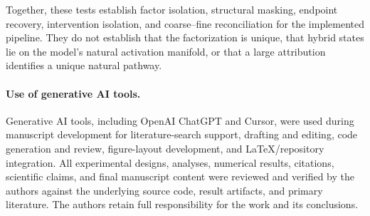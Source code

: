 Together, these tests establish factor isolation, structural masking, endpoint recovery, intervention isolation, and coarse--fine reconciliation for the implemented pipeline. They do not establish that the factorization is unique, that hybrid states lie on the model's natural activation manifold, or that a large attribution identifies a unique natural pathway.

\paragraph{Use of generative AI tools.}
Generative AI tools, including OpenAI ChatGPT and Cursor, were used during manuscript development for literature-search support, drafting and editing, code generation and review, figure-layout development, and LaTeX/repository integration. All experimental designs, analyses, numerical results, citations, scientific claims, and final manuscript content were reviewed and verified by the authors against the underlying source code, result artifacts, and primary literature. The authors retain full responsibility for the work and its conclusions.
